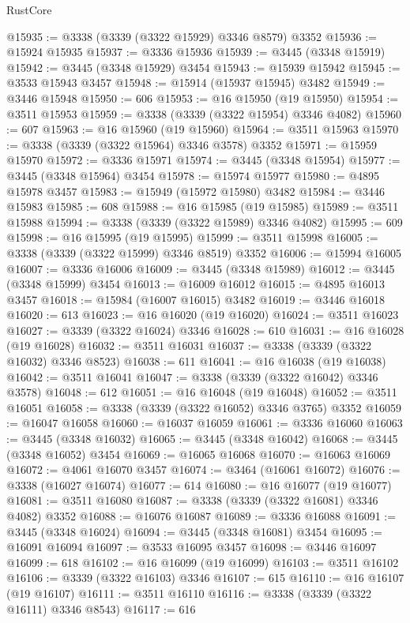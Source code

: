\begin{lexlean}{RustCore}
\begin{coremodule}
@15935 := @3338 (@3339 (@3322 @15929) @3346 @8579) @3352
@15936 := @15924 @15935
@15937 := @3336 @15936
@15939 := @3445 (@3348 @15919)
@15942 := @3445 (@3348 @15929) @3454
@15943 := @15939 @15942
@15945 := @3533 @15943 @3457
@15948 := @15914 (@15937 @15945) @3482
@15949 := @3446 @15948
@15950 := 606
@15953 := @16 @15950 (@19 @15950)
@15954 := @3511 @15953
@15959 := @3338 (@3339 (@3322 @15954) @3346 @4082)
@15960 := 607
@15963 := @16 @15960 (@19 @15960)
@15964 := @3511 @15963
@15970 := @3338 (@3339 (@3322 @15964) @3346 @3578) @3352
@15971 := @15959 @15970
@15972 := @3336 @15971
@15974 := @3445 (@3348 @15954)
@15977 := @3445 (@3348 @15964) @3454
@15978 := @15974 @15977
@15980 := @4895 @15978 @3457
@15983 := @15949 (@15972 @15980) @3482
@15984 := @3446 @15983
@15985 := 608
@15988 := @16 @15985 (@19 @15985)
@15989 := @3511 @15988
@15994 := @3338 (@3339 (@3322 @15989) @3346 @4082)
@15995 := 609
@15998 := @16 @15995 (@19 @15995)
@15999 := @3511 @15998
@16005 := @3338 (@3339 (@3322 @15999) @3346 @8519) @3352
@16006 := @15994 @16005
@16007 := @3336 @16006
@16009 := @3445 (@3348 @15989)
@16012 := @3445 (@3348 @15999) @3454
@16013 := @16009 @16012
@16015 := @4895 @16013 @3457
@16018 := @15984 (@16007 @16015) @3482
@16019 := @3446 @16018
@16020 := 613
@16023 := @16 @16020 (@19 @16020)
@16024 := @3511 @16023
@16027 := @3339 (@3322 @16024) @3346
@16028 := 610
@16031 := @16 @16028 (@19 @16028)
@16032 := @3511 @16031
@16037 := @3338 (@3339 (@3322 @16032) @3346 @8523)
@16038 := 611
@16041 := @16 @16038 (@19 @16038)
@16042 := @3511 @16041
@16047 := @3338 (@3339 (@3322 @16042) @3346 @3578)
@16048 := 612
@16051 := @16 @16048 (@19 @16048)
@16052 := @3511 @16051
@16058 := @3338 (@3339 (@3322 @16052) @3346 @3765) @3352
@16059 := @16047 @16058
@16060 := @16037 @16059
@16061 := @3336 @16060
@16063 := @3445 (@3348 @16032)
@16065 := @3445 (@3348 @16042)
@16068 := @3445 (@3348 @16052) @3454
@16069 := @16065 @16068
@16070 := @16063 @16069
@16072 := @4061 @16070 @3457
@16074 := @3464 (@16061 @16072)
@16076 := @3338 (@16027 @16074)
@16077 := 614
@16080 := @16 @16077 (@19 @16077)
@16081 := @3511 @16080
@16087 := @3338 (@3339 (@3322 @16081) @3346 @4082) @3352
@16088 := @16076 @16087
@16089 := @3336 @16088
@16091 := @3445 (@3348 @16024)
@16094 := @3445 (@3348 @16081) @3454
@16095 := @16091 @16094
@16097 := @3533 @16095 @3457
@16098 := @3446 @16097
@16099 := 618
@16102 := @16 @16099 (@19 @16099)
@16103 := @3511 @16102
@16106 := @3339 (@3322 @16103) @3346
@16107 := 615
@16110 := @16 @16107 (@19 @16107)
@16111 := @3511 @16110
@16116 := @3338 (@3339 (@3322 @16111) @3346 @8543)
@16117 := 616

\end{coremodule}
\end{lexlean}
